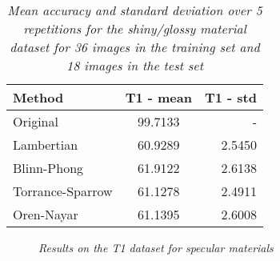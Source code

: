 \begin{table}
	\center
	\begin{tabular}{l|c|r}
	Method 				&	T1 - mean 	& T1 - std \\
	\hline
	Original			&	99.7133		& - \\
	Lambertian 			&	60.9289		& 2.5450 \\
	Blinn-Phong 		& 	61.9122 	& 2.6138 \\
	Torrance-Sparrow 	&	61.1278 	& 2.4911 \\
	Oren-Nayar 			&	61.1395 	& 2.6008 \\
	\end{tabular}
	\caption{{\it Mean accuracy and standard deviation over 5 repetitions for the shiny/glossy material dataset for 36 images in the training set and 18 images in the test set}}
	\label{tab:SpecularResultsB}
\end{table}
\begin{figure}[H]
	\begin{center}
	\end{center}
	\caption{{\it Results on the T1 dataset for specular materials}}
	\label{fig:SpecularPlotB}
\end{figure}



